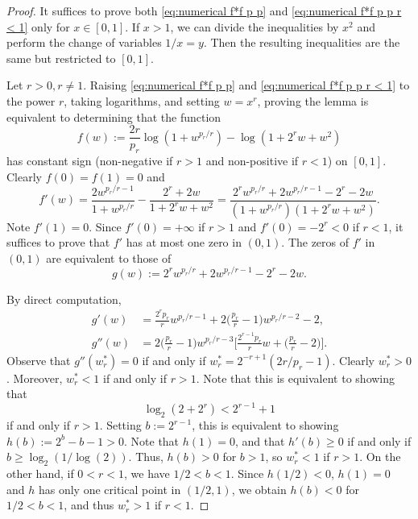 \documentclass[reqno, 10pt]{amsart}
\theoremstyle{plain}
\numberwithin{equation}{section}
\theoremstyle{definition}
\newtheorem*{induction hypothesis}{Induction hypothesis}
\theoremstyle{remark}
\begin{document}
\begin{proof}
It suffices to prove both \eqref{eq:numerical f*f p p} and \eqref{eq:numerical f*f p p r < 1} only for $x \in [0,1]$. If $x>1$, we can divide the inequalities by $x^2$ and perform the change of variables $1/x = y$. Then the resulting inequalities are the same but restricted to $[0,1]$.
    
Let $r>0, r \neq 1$. Raising \eqref{eq:numerical f*f p p} and \eqref{eq:numerical f*f p p r < 1} to the power $r$, taking logarithms, and setting $w=x^{r}$, proving the lemma is equivalent to determining that the function 
\begin{equation*}
    f(w):=\frac{2r}{p_r} \log (1+w^{p_r/r}) - \log(1+2^r w + w^2)
\end{equation*}
has constant sign (non-negative if $r>1$ and non-positive if $r <1$) on $[0,1]$. 
Clearly $f(0)=f(1)=0$ and
\begin{equation*}
    f'(w)= \frac{2 w^{p_r/r -1}}{1+w^{p_r/r}} - \frac{2^r + 2w}{1+2^r w + w^2} = \frac{2^r w^{p_r/r} + 2w^{p_r/r - 1} -2^r -2w}{(1+w^{p_r/r})(1+2^r w + w^2)}.
\end{equation*}
Note $f'(1)=0$. Since $f'(0)=+\infty$ if $r>1$ and $f'(0)=-2^r <0$ if $r<1$, it suffices to prove that $f'$ has at most one zero in $(0,1)$. The zeros of $f'$ in $(0,1)$ are equivalent to those of
\begin{equation*}
    g(w):=2^r w^{p_r/r} + 2w^{p_r/r - 1} -2^r -2w.
\end{equation*}

By direct computation,
\begin{align*}
    g'(w)&=\frac{2^{r}p_r}{r} w^{p_r/r -1} + 2\Big(\frac{p_r}{r}-1\Big)w^{p_r/r-2} - 2,
\\
    g''(w)&=2 \Big(\frac{p_r}{r}-1\Big)w^{p_r/r - 3} \Big[ \frac{2^{r-1}p_r}{r} w + \Big( \frac{p_r}{r} -2 \Big) \Big].
\end{align*}
Observe that $g''(w_r^*)=0$ if and only if $w_r^*=2^{-r+1}(2r/p_r-1)$. Clearly $w_r^*>0$. Moreover, $w_r^* < 1$ if and only if $r>1$. Note that this is equivalent to showing that
\begin{equation}\label{eq:w_r^*}
    \log_2(2+2^r) < 2^{r-1} +1
\end{equation}
if and only if $r>1$. Setting $b:=2^{r-1}$, this is equivalent to showing $h(b):=2^b-b-1>0$. Note that $h(1)=0$, and that $h'(b) \geq 0$ if and only if $b \geq \log_2(1/\log(2))$. Thus, $h(b)>0$ for $b >1$, so $w_r^* < 1$ if $r >1$. On the other hand, if $0<r<1$, we have $1/2<b<1$. Since $h(1/2)<0$, $h(1)=0$ and $h$ has only one critical point in $(1/2,1)$, we obtain $h(b)<0$ for $1/2<b<1$, and thus $w_r^*>1$ if $r<1$.


\end{proof}
\end{document}
